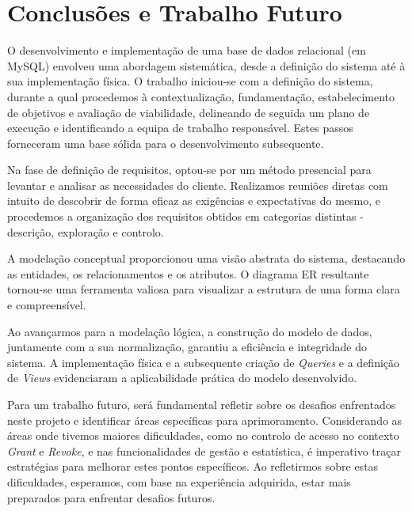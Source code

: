 \documentclass[a4paper,12pt]{scrreprt}
\begin{document}
\chapter{Conclusões e Trabalho Futuro}

    O desenvolvimento e implementação de uma base de dados relacional (em MySQL) envolveu uma abordagem sistemática, 
    desde a definição do sistema até à sua implementação física. O trabalho iniciou-se com a definição
    do sistema, durante a qual procedemos à contextualização, fundamentação, estabelecimento de objetivos
    e avaliação de viabilidade, delineando de seguida um plano de execução e identificando a equipa 
    de trabalho responsável. Estes passos forneceram uma base sólida para o desenvolvimento subsequente.

    Na fase de definição de requisitos, optou-se por um método presencial para levantar e analisar
    as necessidades do cliente. Realizamos reuniões diretas com intuito de descobrir de forma 
    eficaz as exigências e expectativas do mesmo, e procedemos a organização dos requisitos
    obtidos em categorias distintas - descrição, exploração e controlo.

    A modelação conceptual proporcionou uma visão abstrata do sistema, destacando as entidades,
    os relacionamentos e os atributos. O diagrama ER resultante tornou-se uma ferramenta 
    valiosa para visualizar a estrutura de uma forma clara e compreensível.

    Ao avançarmos para a modelação lógica, a construção do modelo de dados, juntamente 
    com a sua normalização, garantiu a eficiência e integridade do sistema. A implementação física e a subsequente criação 
    de \textit{Queries} e a definição de \textit{Views} evidenciaram a aplicabilidade prática do modelo desenvolvido.

   Para um trabalho futuro, será fundamental refletir sobre os desafios enfrentados neste projeto e identificar áreas específicas para aprimoramento. Considerando as áreas onde tivemos maiores dificuldades, como no controlo de acesso no contexto \textit{Grant} e \textit{Revoke}, e nas funcionalidades de gestão e estatística, é imperativo traçar estratégias para melhorar estes pontos específicos. Ao refletirmos sobre estas dificuldades, esperamos, com base na experiência adquirida, estar mais preparados para enfrentar desafios futuros.

    
    


\end{document}
